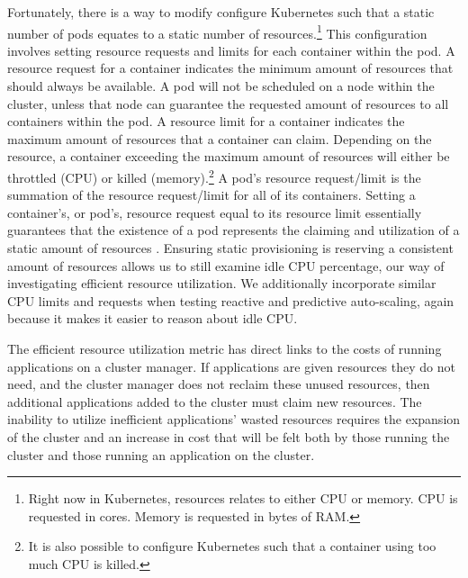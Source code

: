 Fortunately, there is a way to modify configure Kubernetes such that a static number of
pods equates to a static number of resources.\footnote{Right now in Kubernetes,
resources relates to either CPU or memory. CPU is requested in cores. Memory is
requested in bytes of RAM.} This configuration involves
setting resource requests and limits for each container within the pod. A
resource request for a container indicates the minimum amount of resources that
should always be available. A pod will not be scheduled on a node within the
cluster, unless that node can guarantee the requested amount of resources to all
containers within the pod. A resource limit for a container indicates the
maximum amount of resources that a container can claim. Depending on the
resource, a container exceeding the maximum amount of resources will either be
throttled (CPU) or killed (memory).\footnote{It is also possible to configure
Kubernetes such that a container using too much CPU is killed.} A pod's resource
request/limit is the summation of the resource request/limit for all of its
containers. Setting a container's, or pod's, resource request equal to its
resource limit essentially guarantees that the existence of a pod represents the
claiming and utilization of a static amount of resources
\cite{k8s-compute-resources}. Ensuring static provisioning
is reserving a consistent amount of resources
allows us to still examine idle CPU percentage, our way of investigating
efficient resource utilization. We additionally incorporate similar CPU limits
and requests when testing reactive and predictive auto-scaling, again because it
makes it easier to reason about idle CPU.

The efficient resource utilization metric has direct links to the costs of
running applications on a cluster manager. If applications are given resources
they do not need, and the cluster manager does not reclaim these unused
resources, then additional applications added to the cluster must claim new
resources. The inability to utilize inefficient applications' wasted resources
requires the expansion of the cluster and an increase in cost that will be felt
both by those running the cluster and those running an application on the
cluster.
